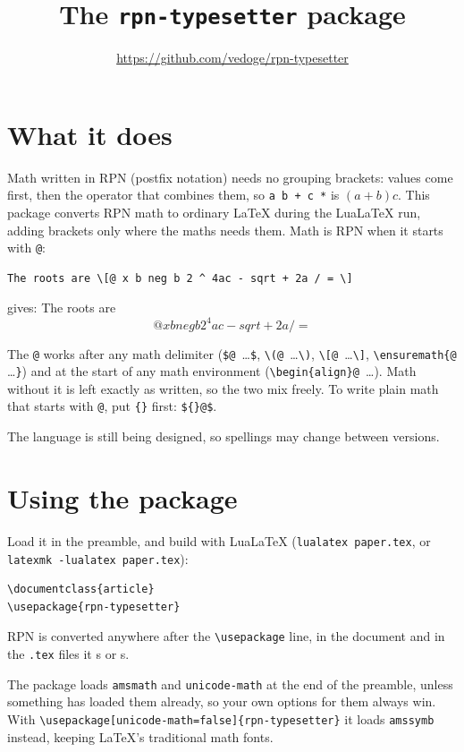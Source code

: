 \documentclass{article}
\title{The \texttt{rpn-typesetter} package}
\author{\url{https://github.com/vedoge/rpn-typesetter}}
\date{\rpnversion}
\begin{document}
\maketitle

\section{What it does}

Math written in RPN (postfix notation) needs no grouping brackets: values come
first, then the operator that combines them, so \verb|a b + c *| is $(a + b)c$.
This package converts RPN math to ordinary LaTeX during the LuaLaTeX run,
adding brackets only where the maths needs them. Math is RPN when it starts
with \verb|@|:
\begin{verbatim}
The roots are \[@ x b neg b 2 ^ 4ac - sqrt + 2a / = \]
\end{verbatim}
gives: The roots are \[@ x b neg b 2 ^ 4ac - sqrt + 2a / = \]

The \verb|@| works after any math delimiter (\verb|$@ |\dots\verb|$|,
\verb|\(@ |\dots\verb|\)|, \verb|\[@ |\dots\verb|\]|,
\verb|\ensuremath{@ |\dots\verb|}|) and at the start of any math environment
(\verb|\begin{align}@ |\dots). Math without it is left exactly as written, so
the two mix freely. To write plain math that starts with \verb|@|, put
\verb|{}| first: \verb|${}@$|.

The language is still being designed, so spellings may change between
versions.

\section{Using the package}

Load it in the preamble, and build with LuaLaTeX (\verb|lualatex paper.tex|,
or \verb|latexmk -lualatex paper.tex|):
\begin{verbatim}
\documentclass{article}
\usepackage{rpn-typesetter}
\end{verbatim}
RPN is converted anywhere after the \verb|\usepackage| line, in the document
and in the \verb|.tex| files it \verb||s or \verb||s.

The package loads \verb|amsmath| and \verb|unicode-math| at the end of the
preamble, unless something has loaded them already, so your own options for
them always win. With \verb|\usepackage[unicode-math=false]{rpn-typesetter}|
it loads \verb|amssymb| instead, keeping LaTeX's traditional math fonts.
\end{document}
